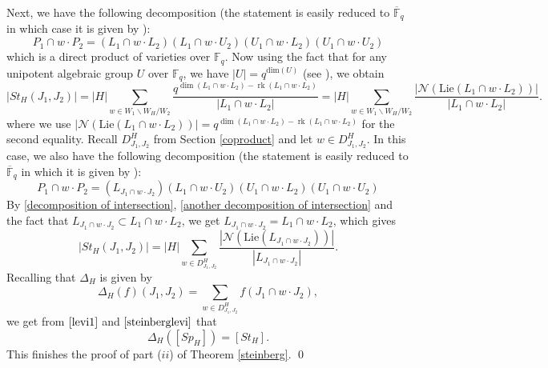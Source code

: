 \documentclass{amsart}
\theoremstyle{plain}
\theoremstyle{definition}
\theoremstyle{remark}
\DeclareMathOperator{\rk}{rk}
\begin{document}
Next, we have the following decomposition (the statement is easily reduced to $\overline{\mathbb{F}}_{q}$ in which case it is given by \cite[Proposition 2.15]{DM}):
\begin{equation}\label{decomposition of intersection}
P_{1}\cap w\cdot P_{2}=(L_{1}\cap w\cdot L_{2})(L_{1}\cap w\cdot U_{2})(U_{1}\cap w\cdot L_{2})(U_{1}\cap w\cdot U_{2})
\end{equation}
which is a direct product of varieties over $\mathbb{F}_{q}$. Now using the fact that for any unipotent algebraic group $U$ over $\mathbb{F}_{q}$, we have $|U|=q^{\text{dim}(U)}$ (see \cite[Corollary 14.2.7]{Spr}), we obtain
\[
|St_{H}(J_1,J_2)|=|H|\sum_{w\in W_{1}\backslash W_{H}/W_2}\frac{q^{\dim(L_1\cap w\cdot L_2)-\rk(L_1\cap w\cdot L_2)}}{|L_{1}\cap w\cdot L_2|}=|H|\sum_{w\in W_{1}\backslash W_{H}/W_2}\frac{|\mathcal{N}(\text{Lie}(L_{1}\cap w\cdot L_{2}))|}{|L_{1}\cap w\cdot L_2|}.
\]
where we use $|\mathcal{N}(\text{Lie}(L_{1}\cap w\cdot L_{2}))|=q^{\dim(L_{1}\cap w\cdot L_{2})-\rk(L_{1}\cap w\cdot L_{2})}$ for the second equality. 
Recall $D^{H}_{J_{1},J_{2}}$ from Section \ref{coproduct} and let $w\in D^{H}_{J_{1},J_{2}}$. In this case, we also have the following decomposition (the statement is easily reduced to $\overline{\mathbb{F}}_{q}$ in which it is given by \cite[Theorem 2.8.7]{Car}):
\begin{equation}\label{another decomposition of intersection}
    P_{1}\cap w\cdot P_{2}=(L_{J_{1}\cap w\cdot J_{2}})(L_{1}\cap w\cdot U_{2})(U_{1}\cap w\cdot L_{2})(U_{1}\cap w\cdot U_{2})
\end{equation}
By \eqref{decomposition of intersection}, \eqref{another decomposition of intersection} and the fact that $L_{J_{1}\cap w\cdot J_2}\subset L_{1}\cap w\cdot L_{2}$, we get $L_{J_{1}\cap w\cdot J_2}=L_{1}\cap w\cdot L_{2}$, which gives
\begin{equation}\label{steinberglevi}
    |St_{H}(J_1,J_2)|=|H|\sum_{w\in D^{H}_{J_{1},J_{2}}}\frac{|\mathcal{N}(\text{Lie}(L_{J_{1}\cap w\cdot J_{2}}))|}{|L_{J_{1}\cap w\cdot J_2}|}.
\end{equation}
Recalling that $\Delta_{H}$ is given by
\[
\Delta_{H}(f)(J_1,J_2)=\sum_{w\in D^{H}_{J_{1},J_{2}}}f(J_{1}\cap w\cdot J_{2}),
\]
we get from $\eqref{levi1}$ and $\eqref{steinberglevi}$ that
\[
\Delta_{H}([Sp_{H}])=[St_{H}].
\]
This finishes the proof of part ($ii$) of Theorem \ref{steinberg}.
\qed
\end{document}
